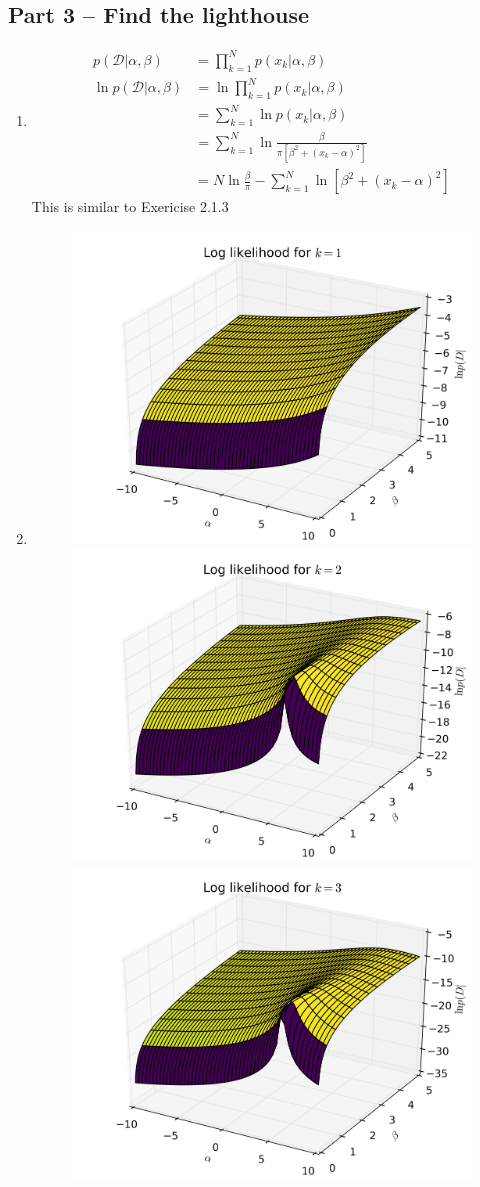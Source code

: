 \documentclass{article}
\begin{document}
\subsection*{Part 3 -- Find the lighthouse}
\begin{enumerate}
\item 
\begin{align*}
p(\mathcal{D} | \alpha, \beta) &= \prod_{k=1}^N p(x_k | \alpha, \beta) \\
\ln p(\mathcal{D} | \alpha, \beta) &= \ln\prod_{k=1}^N p(x_k | \alpha, \beta) \\
&= \sum_{k=1}^N\ln p(x_k | \alpha, \beta) \\
&= \sum_{k=1}^N\ln\frac{\beta}{\pi[\beta^2+(x_k - \alpha)^2]} \\
&= N\ln\frac{\beta}{\pi} - \sum_{k=1}^N \ln[\beta^2+(x_k - \alpha)^2]
\end{align*}
This is similar to Exericise 2.1.3
\item 
\begin{figure}[H]
\centering
\includegraphics[width=.45\textwidth]{images/logl_1.png}
\includegraphics[width=.45\textwidth]{images/logl_2.png}
\includegraphics[width=.45\textwidth]{images/logl_3.png}

\end{figure}
\end{enumerate}
\end{document}
